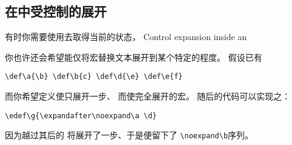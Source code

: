 \documentclass{book}
\begin{document}
\subsection{在中受控制的展开}

有时你需要使用去取得当前的状态，
\howto Control expansion inside an \par
你也许还会希望能仅将宏替换文本展开到某个特定的程度。
假设已有
\begin{verbatim}
\def\a{\b} \def\b{c} \def\d{\e} \def\e{f}
\end{verbatim}
而你希望定义使只展开一步、
而使完全展开的宏。
随后的代码可以实现之：
\begin{verbatim}
\edef\g{\expandafter\noexpand\a \d}
\end{verbatim}
因为越过其后的
将展开了一步、于是便留下了
\verb-\noexpand\b-序列。
\end{document}
